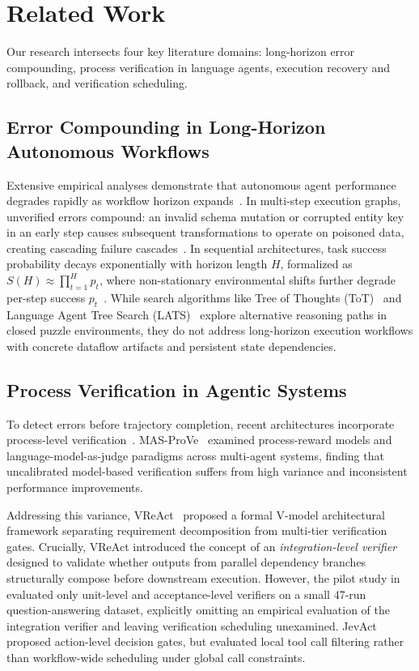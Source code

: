 \section{Related Work}
\label{sec:related_work}

Our research intersects four key literature domains: long-horizon error compounding, process verification in language agents, execution recovery and rollback, and verification scheduling.

\subsection{Error Compounding in Long-Horizon Autonomous Workflows}
Extensive empirical analyses demonstrate that autonomous agent performance degrades rapidly as workflow horizon expands~\citep{sinha2025illusion,wang2026reasoning}. In multi-step execution graphs, unverified errors compound: an invalid schema mutation or corrupted entity key in an early step causes subsequent transformations to operate on poisoned data, creating cascading failure cascades~\citep{chen2026horizon}. In sequential architectures, task success probability decays exponentially with horizon length $H$, formalized as $S(H) \approx \prod_{t=1}^H p_t$, where non-stationary environmental shifts further degrade per-step success $p_t$~\citep{wang2026reasoning}. While search algorithms like Tree of Thoughts (ToT)~\citep{yao2023tot} and Language Agent Tree Search (LATS)~\citep{zhou2024lats} explore alternative reasoning paths in closed puzzle environments, they do not address long-horizon execution workflows with concrete dataflow artifacts and persistent state dependencies.

\subsection{Process Verification in Agentic Systems}
To detect errors before trajectory completion, recent architectures incorporate process-level verification~\citep{venkataramani2026masprove,afoud2026vreact}. MAS-ProVe~\citep{venkataramani2026masprove} examined process-reward models and language-model-as-judge paradigms across multi-agent systems, finding that uncalibrated model-based verification suffers from high variance and inconsistent performance improvements. 

Addressing this variance, VReAct~\citep{afoud2026vreact} proposed a formal V-model architectural framework separating requirement decomposition from multi-tier verification gates. Crucially, VReAct introduced the concept of an \emph{integration-level verifier} designed to validate whether outputs from parallel dependency branches structurally compose before downstream execution. However, the pilot study in~\citep{afoud2026vreact} evaluated only unit-level and acceptance-level verifiers on a small 47-run question-answering dataset, explicitly omitting an empirical evaluation of the integration verifier and leaving verification scheduling unexamined. JevAct~\citep{shoham2026jevact} proposed action-level decision gates, but evaluated local tool call filtering rather than workflow-wide scheduling under global call constraints.

